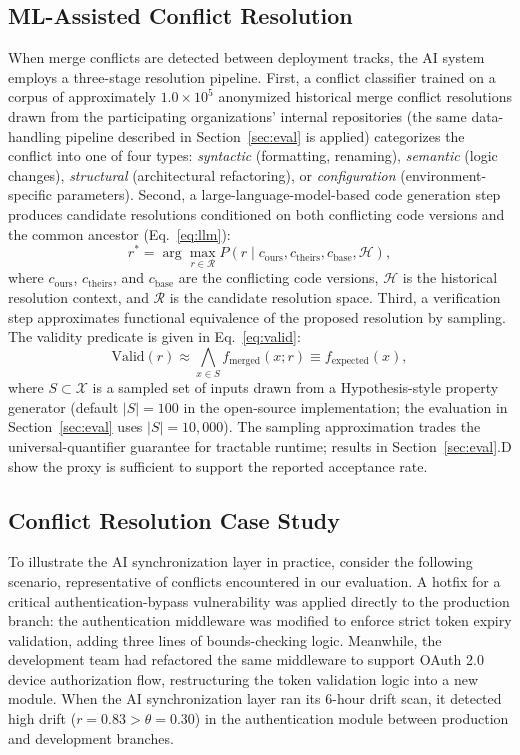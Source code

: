 \documentclass{ieeeaccess}
\begin{document}
\subsection{ML-Assisted Conflict Resolution}
When merge conflicts are detected between deployment tracks, the AI system employs a three-stage resolution pipeline. First, a conflict classifier trained on a corpus of approximately $1.0 \times 10^{5}$ anonymized historical merge conflict resolutions drawn from the participating organizations' internal repositories (the same data-handling pipeline described in Section~\ref{sec:eval} is applied) categorizes the conflict into one of four types: \emph{syntactic} (formatting, renaming), \emph{semantic} (logic changes), \emph{structural} (architectural refactoring), or \emph{configuration} (environment-specific parameters). Second, a large-language-model-based code generation step produces candidate resolutions conditioned on both conflicting code versions and the common ancestor (Eq.~\eqref{eq:llm}):
\begin{equation}
r^{*} = \arg\max_{r \in \mathcal{R}} P(r \mid c_{\mathrm{ours}}, c_{\mathrm{theirs}}, c_{\mathrm{base}}, \mathcal{H}),
\label{eq:llm}
\end{equation}
where $c_{\mathrm{ours}}$, $c_{\mathrm{theirs}}$, and $c_{\mathrm{base}}$ are the conflicting code versions, $\mathcal{H}$ is the historical resolution context, and $\mathcal{R}$ is the candidate resolution space. Third, a verification step approximates functional equivalence of the proposed resolution by sampling. The validity predicate is given in Eq.~\eqref{eq:valid}:
\begin{equation}
\mathrm{Valid}(r) \approx \bigwedge_{x \in S} f_{\mathrm{merged}}(x; r) \equiv f_{\mathrm{expected}}(x),
\label{eq:valid}
\end{equation}
where $S \subset \mathcal{X}$ is a sampled set of inputs drawn from a Hypothesis-style property generator (default $|S| = 100$ in the open-source implementation; the evaluation in Section~\ref{sec:eval} uses $|S| = 10{,}000$). The sampling approximation trades the universal-quantifier guarantee for tractable runtime; results in Section~\ref{sec:eval}.D show the proxy is sufficient to support the reported acceptance rate.

\subsection{Conflict Resolution Case Study}
To illustrate the AI synchronization layer in practice, consider the following scenario, representative of conflicts encountered in our evaluation. A hotfix for a critical authentication-bypass vulnerability was applied directly to the production branch: the authentication middleware was modified to enforce strict token expiry validation, adding three lines of bounds-checking logic. Meanwhile, the development team had refactored the same middleware to support OAuth 2.0 device authorization flow, restructuring the token validation logic into a new module. When the AI synchronization layer ran its 6-hour drift scan, it detected high drift ($r = 0.83 > \theta = 0.30$) in the authentication module between production and development branches.
\end{document}
